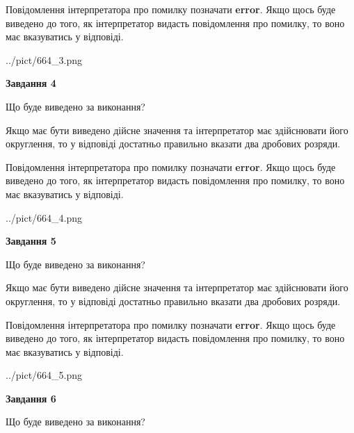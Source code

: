 \documentclass[12pt, ukrainian]{article}
\begin{document}
{\begin {Large}
Повідомлення інтерпретатора про помилку позначати \textbf{error}.
Якщо щось буде виведено до того, як інтерпретатор видасть повідомлення про помилку, 
то воно має вказуватись у відповіді. \par

\begin{center}
	{../pict/664_3.png}
\end{center}
\newpage

{\begin {center}\textbf{Завдання 4}\end {center}}\par
Що буде виведено за виконання? \par

Якщо має бути виведено дійсне значення та інтерпретатор має здійснювати його округлення, 
то у відповіді достатньо правильно вказати два дробових розряди.

Повідомлення інтерпретатора про помилку позначати \textbf{error}.
Якщо щось буде виведено до того, як інтерпретатор видасть повідомлення про помилку, 
то воно має вказуватись у відповіді. \par

\begin{center}
	{../pict/664_4.png}
\end{center}
\newpage

{\begin {center}\textbf{Завдання 5}\end {center}}\par
Що буде виведено за виконання? \par

Якщо має бути виведено дійсне значення та інтерпретатор має здійснювати його округлення, 
то у відповіді достатньо правильно вказати два дробових розряди.

Повідомлення інтерпретатора про помилку позначати \textbf{error}.
Якщо щось буде виведено до того, як інтерпретатор видасть повідомлення про помилку, 
то воно має вказуватись у відповіді. \par

\begin{center}
	{../pict/664_5.png}
\end{center}
\newpage

{\begin {center}\textbf{Завдання 6}\end {center}}\par
Що буде виведено за виконання? \par


\end{Large}}
\end{document}
